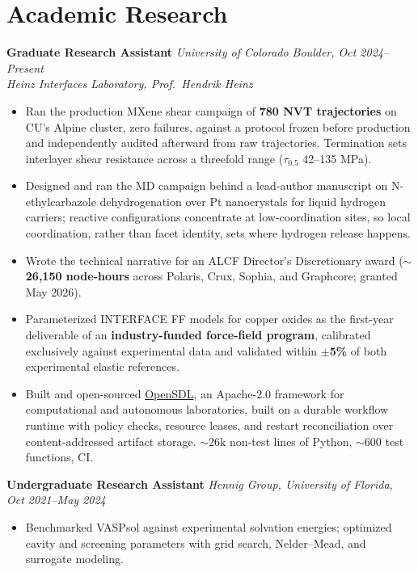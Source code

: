 \documentclass[letterpaper,10pt]{article}
\newcommand{\keep}{\needspace{4\baselineskip}}
\newcommand{\keepsection}{\needspace{6\baselineskip}}
\begin{document}
\keepsection\section*{Academic Research}
\textbf{Graduate Research Assistant} \hfill \textit{University of Colorado Boulder, Oct 2024--Present}\\
\textit{Heinz Interfaces Laboratory, Prof.\ Hendrik Heinz}
\begin{itemize}
    \item Ran the production MXene shear campaign of \textbf{780 NVT trajectories} on CU's Alpine cluster, zero failures, against a protocol frozen before production and independently audited afterward from raw trajectories. Termination sets interlayer shear resistance across a threefold range (\(\tau_{0.5}\) 42--135 MPa).
    \item Designed and ran the MD campaign behind a lead-author manuscript on N-ethylcarbazole dehydrogenation over Pt nanocrystals for liquid hydrogen carriers; reactive configurations concentrate at low-coordination sites, so local coordination, rather than facet identity, sets where hydrogen release happens.
    \item Wrote the technical narrative for an ALCF Director's Discretionary award (\(\sim\)\textbf{26,150 node-hours} across Polaris, Crux, Sophia, and Graphcore; granted May 2026).
    \item Parameterized INTERFACE FF models for copper oxides as the first-year deliverable of an \textbf{industry-funded force-field program}, calibrated exclusively against experimental data and validated within \textbf{\(\pm\)5\%} of both experimental elastic references.
    \item Built and open-sourced \href{https://github.com/fl-sean03/OpenSDL}{OpenSDL}, an Apache-2.0 framework for computational and autonomous laboratories, built on a durable workflow runtime with policy checks, resource leases, and restart reconciliation over content-addressed artifact storage. \(\sim\)26k non-test lines of Python, \(\sim\)600 test functions, CI.
\end{itemize}

\keep\textbf{Undergraduate Research Assistant} \hfill \textit{Hennig Group, University of Florida, Oct 2021--May 2024}
\begin{itemize}
    \item Benchmarked VASPsol against experimental solvation energies; optimized cavity and screening parameters with grid search, Nelder--Mead, and surrogate modeling.
\end{itemize}
\end{document}
